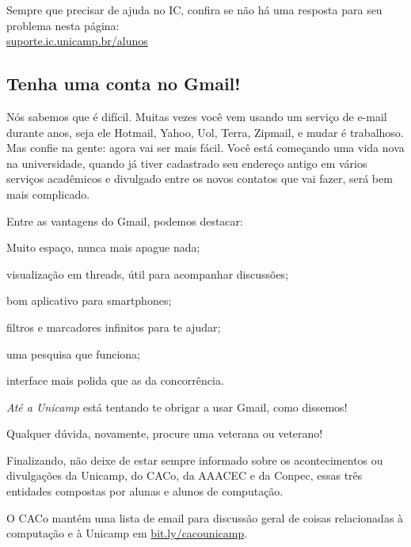 Sempre que precisar de ajuda no IC, confira se não há uma resposta para seu
problema nesta página:\\
\url{suporte.ic.unicamp.br/alunos}


\subsection{Tenha uma conta no Gmail!}

Nós sabemos que é difícil. Muitas vezes você vem usando um serviço de e-mail
durante anos, seja ele Hotmail, Yahoo, Uol, Terra, Zipmail, e mudar é
trabalhoso. Mas confie na gente: agora vai ser mais fácil. Você está começando
uma vida nova na universidade, quando já tiver cadastrado seu endereço antigo
em vários serviços acadêmicos e divulgado entre os novos contatos que vai
fazer, será bem mais complicado.

Entre as vantagens do Gmail, podemos destacar:

\begin{compactitemize}
\item Muito espaço, nunca mais apague nada;
\item visualização em threads, útil para acompanhar discussões;
\item bom aplicativo para smartphones;
\item filtros e marcadores infinitos para te ajudar;
\item uma pesquisa que funciona;
\item interface mais polida que as da concorrência.
\end{compactitemize}

\emph{Até a Unicamp} está tentando te obrigar a usar Gmail, como dissemos!
\shrug

Qualquer dúvida, novamente, procure uma veterana ou veterano!

Finalizando, não deixe de estar sempre informado sobre os acontecimentos ou
divulgações da Unicamp, do CACo, da AAACEC e da Conpec, essas três entidades
compostas por alunas e alunos de computação.

O CACo mantém uma lista de email para discussão geral de coisas relacionadas à
computação e à Unicamp em \url{bit.ly/cacounicamp}.
